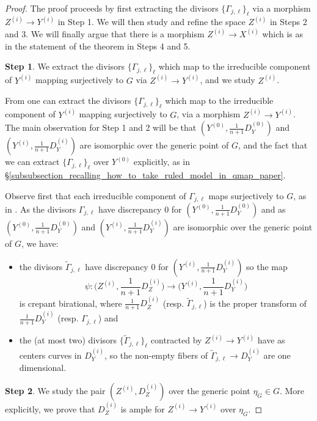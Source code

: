 \documentclass[a4paper,12pt]{amsart}
\theoremstyle{definition}
\theoremstyle{remark}
\begin{document}
\begin{proof}
    The proof proceeds by first extracting the divisors $\{\Gamma_{j,\ell}\}_\ell$ via a morphism $Z^{(i)}\to Y^{(i)}$ in Step 1. We will then study and refine the space $Z^{(i)}$ in Steps 2 and 3. We will finally argue that there is a morphism $Z^{(i)}\to X^{(i)}$ which is as in the statement of the theorem in Steps 4 and 5. 
    
    \textbf{Step 1}. We extract the divisors $\{\Gamma_{j,\ell}\}_\ell$ which map to the irreducible component of $Y^{(i)}$ mapping surjectively to $G$ via $Z^{(i)}\to Y^{(i)}$, and we study $Z^{(i)}$.
    
    From \cite[Corollary 1]{moraga2020extracting} one can extract the divisors $\{\Gamma_{j,\ell}\}_\ell$ which map to the irreducible component of $Y^{(i)}$ mapping surjectively to $G$, via a morphism $Z^{(i)}\to Y^{(i)}$. The main observation for Step 1 and 2 will be that $(Y^{(0)},\frac{1}{n+1}D_Y^{(0)})$ and $(Y^{(i)},\frac{1}{n+1}D_Y^{(i)})$ are isomorphic over the generic point of $G$, and the fact that we can extract $\{\Gamma_{j,\ell}\}_\ell$ over $Y^{(0)}$ explicitly, as in \S \ref{subsubsection_recalling_how_to_take_ruled_model_in_qmap_paper}. 


    
     Observe first that each irreducible component of $\Gamma_{j,\ell}$ maps surjectively to $G$, as in .
     As the divisors $\Gamma_{j,\ell}$ have discrepancy 0 for $(Y^{(0)},\frac{1}{n+1}D_Y^{(0)})$ and as $(Y^{(0)},\frac{1}{n+1}D_Y^{(0)})$ and $(Y^{(i)},\frac{1}{n+1}D_Y^{(i)})$ are isomorphic over the generic point of $G$, we have:
     \begin{itemize}
         \item the divisors $\widetilde{\Gamma}_{j,\ell}$ have discrepancy 0 for $(Y^{(i)},\frac{1}{n+1}D_Y^{(i)})$ so the map 
     \[\textstyle
     \psi\colon \big(Z^{(i)},\frac{1}{n+1}D_Z^{(i)}\big)\to \big(Y^{(i)},\frac{1}{n+1}D_Y^{(i)}\big)
     \]
     is crepant birational, where $\frac{1}{n+1}D_Z^{(i)}$ (resp. $\widetilde{\Gamma}_{j,\ell}$) is the proper transform of $\frac{1}{n+1}D_Y^{(i)}$ (resp. $\Gamma_{j,\ell}$) and
     \item the (at most two) divisors $\{\widetilde{\Gamma}_{j,\ell}\}_\ell$ contracted by $Z^{(i)}\to Y^{(i)}$ have as centers curves in $D_Y^{(i)}$, so the non-empty fibers of $\widetilde{\Gamma}_{j,\ell}\to D_Y^{(i)}$ are one dimensional.
     \end{itemize}

     \textbf{Step 2}. We study the pair $(Z^{(i)},D_Z^{(i)})$ over the generic point $\eta_G\in G$. More explicitly, we prove that $D_Z^{(i)}$ is ample for $Z^{(i)}\to Y^{(i)}$ over $\eta_G$.
     

\end{proof}
\end{document}
